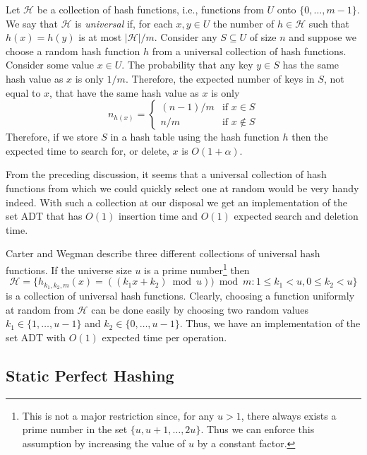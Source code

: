 Let $\mathcal{H}$ be a collection of hash functions, i.e., functions
from $U$ onto $\{0,\ldots,m-1\}$.  We say that $\mathcal{H}$ is
\emph{universal} if, for each $x,y\in
U$ the number of $h\in \mathcal{H}$ such that $h(x)=h(y)$ is at most
$|\mathcal{H}|/m$.  Consider any $S\subseteq U$ of size $n$ and
suppose we choose a random hash function $h$ from a universal
collection of hash functions.  Consider some value $x\in U$.  The
probability that any key $y\in S$ has the same hash value as $x$ is
only $1/m$.  Therefore, the expected number of keys in $S$, not equal
to $x$, that have the same hash value as $x$ is only \[ n_{h(x)} =
\left\{\begin{array}{ll} (n-1)/m & \mbox{if $x\in S$} \\ n/m &
\mbox{if $x\notin S$} \end{array}\right.  \] Therefore, if we store
$S$ in a hash table using the hash function $h$ then the expected time
to search for, or delete, $x$ is $O(1+\alpha)$.

From the preceding discussion, it seems that a universal collection of
hash functions from which we could quickly select one at random would be
very handy indeed. With such a collection at our disposal we get an
implementation of the set ADT that has $O(1)$ insertion time and
$O(1)$ expected search and deletion time.

Carter and Wegman \cite{cw79} describe three different collections of
universal hash functions.  If the universe size $u$ is a
prime number\footnote{This is not a major restriction since, for any
$u>1$, there always exists a prime number in the set
$\{u,u+1,\ldots,2u\}$.  Thus we can enforce this assumption by
increasing the value of $u$ by a constant factor.} then
\[
  \mathcal{H} = \{ h_{k_1,k_2,m}(x)=((k_1x+k_2)\bmod u))\bmod m : 1\le k_1< u,
0\le k_2< u\} 
\]
is a collection of universal hash functions.  Clearly, choosing a
function uniformly at random from $\mathcal{H}$ can be done easily by
choosing two random values $k_1\in \{1,\ldots,u-1\}$ and $k_2\in
\{0,\ldots,u-1\}$.  Thus, we have an implementation of the set ADT with
$O(1)$ expected time per operation.

 
\subsection{Static Perfect Hashing}
\label{hash:sec:fks}

